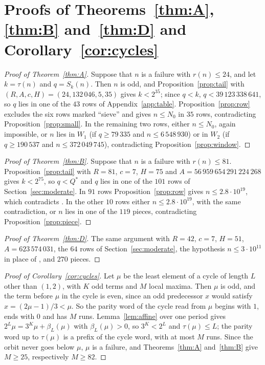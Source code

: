 \documentclass[11pt]{amsart}
\theoremstyle{definition}
\theoremstyle{remark}
\begin{document}
\section{Proofs of Theorems~\ref{thm:A}, \ref{thm:B} and~\ref{thm:D} and Corollary~\ref{cor:cycles}}\label{sec:proofs}

\begin{proof}[Proof of Theorem~\ref{thm:A}]
Suppose that $n$ is a failure with $r(n)\le24$, and let $k=\tau(n)$ and $q=S_k(n)$. Then $n$ is odd, and Proposition~\ref{prop:tail} with $(R,A,c,H)=(24,132\,046,5,35)$ gives $k<2^{35}$; since $q<k$, $q<39\,123\,338\,641$, so $q$ lies in one of the $43$ rows of Appendix~\ref{app:table}. Proposition~\ref{prop:row} excludes the six rows marked ``sieve'' and gives $n\le N_0$ in $35$ rows, contradicting Proposition~\ref{prop:small}. In the remaining two rows, either $n\le N_0$, again impossible, or $n$ lies in $W_1$ (if $q\ge79\,335$ and $n\le6\,548\,930$) or in $W_2$ (if $q\ge190\,537$ and $n\le372\,049\,745$), contradicting Proposition~\ref{prop:window}.
\end{proof}

\begin{proof}[Proof of Theorem~\ref{thm:B}]
Suppose that $n$ is a failure with $r(n)\le81$. Proposition~\ref{prop:tail} with $R=81$, $c=7$, $H=75$ and $A=56\,959\,654\,291\,224\,268$ gives $k<2^{75}$, so $q<Q^{*}$ and $q$ lies in one of the $101$ rows of Section~\ref{sec:moderate}. In $91$ rows Proposition~\ref{prop:row} gives $n\le2.8\cdot10^{19}$, which contradicts \cite[Corollary~5.4]{RT26}. In the other $10$ rows either $n\le2.8\cdot10^{19}$, with the same contradiction, or $n$ lies in one of the $119$ pieces, contradicting Proposition~\ref{prop:piece}.
\end{proof}

\begin{proof}[Proof of Theorem~\ref{thm:D}]
The same argument with $R=42$, $c=7$, $H=51$, $A=623\,574\,031$, the $64$ rows of Section~\ref{sec:moderate}, the hypothesis $n\le3\cdot10^{11}$ in place of \cite[Corollary~5.4]{RT26}, and $270$ pieces.
\end{proof}

\begin{proof}[Proof of Corollary~\ref{cor:cycles}]
Let $\mu$ be the least element of a cycle of length $L$ other than $(1,2)$, with $K$ odd terms and $M$ local maxima. Then $\mu$ is odd, and the term before $\mu$ in the cycle is even, since an odd predecessor $x$ would satisfy $x=(2\mu-1)/3<\mu$. So the parity word of the cycle read from $\mu$ begins with $1$, ends with $0$ and has $M$ runs. Lemma~\ref{lem:affine} over one period gives $2^{L}\mu=3^{K}\mu+\beta_L(\mu)$ with $\beta_L(\mu)>0$, so $3^{K}<2^{L}$ and $\tau(\mu)\le L$; the parity word up to $\tau(\mu)$ is a prefix of the cycle word, with at most $M$ runs. Since the orbit never goes below $\mu$, $\mu$ is a failure, and Theorems~\ref{thm:A} and~\ref{thm:B} give $M\ge25$, respectively $M\ge82$.
\end{proof}
\end{document}
